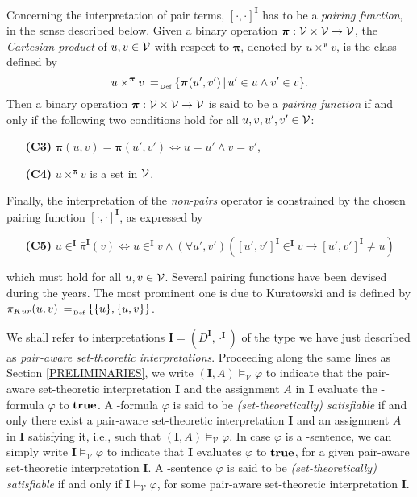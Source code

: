 \documentclass[a4paper]{llncs}
\newcommand{\nonpairssym}{\bar{\pi}}
\newcommand{\inter}{\ensuremath{\mathbf{I}}\xspace}
\newcommand{\vmodels}[2]{#1 \models_{\mathcal{V}} #2}
\newcommand{\vsat}[1]{\vmodels{*}{#1}}
\begin{document}
Concerning the interpretation of pair terms, $[\cdot,\cdot]^{\inter}$ 
has to be a \emph{pairing function},
in the sense described below.
Given a binary operation $\boldsymbol{\pi}: \mathcal{V} \times \mathcal{V} 
\rightarrow \mathcal{V}$, the \emph{Cartesian product} of $u, v \in \mathcal{V}$ 
with
respect to $\boldsymbol{\pi}$, denoted by $u 
\times^{\boldsymbol{\pi}} v$, is the class defined by
\[
u \times^{\boldsymbol{\pi}} v \defAs \{ \boldsymbol{\pi}(u',v') \,|\, 
u' \in u \wedge v' \in v \}.
\]
Then a binary operation $\boldsymbol{\pi}: \mathcal{V} \times \mathcal{V} 
\rightarrow \mathcal{V}$ is said to be a \emph{pairing function} if
and only if the following two conditions hold for all $u,v,u',v' \in
\mathcal{V}$:
\begin{enumerate}[leftmargin=.9cm]
  \item[\textbf{(C3)}]$\boldsymbol{\pi}(u,v)=\boldsymbol{\pi}(u',v') 
\iff u=u' \wedge v=v'$,
  \item[\textbf{(C4)}]$u \times^{\boldsymbol{\pi}} v$ is a set in $\mathcal{V}$.
\end{enumerate}
Finally, the interpretation of the
\emph{non-pairs} operator is constrained by the chosen
pairing function $[\cdot,\cdot]^\inter$, as expressed by
\begin{enumerate}[leftmargin=.9cm]
  \item[\textbf{(C5)}]\label{NONPAIR}
$u \in^{\inter} \nonpairssym^{\inter}(v) \iff u \in^{\inter} v \wedge 
(\forall u', v')([u', v']^{\inter} \in^{\inter} v \rightarrow [u', 
v']^{\inter}\neq u)
$
\end{enumerate}
which must hold for all $u,v \in \mathcal{V}$. Several pairing
functions have been devised during the years.
The most prominent one is due to Kuratowski and is defined by $\pi_{Kur}(u, v)
\defAs \{\{u\}, \{u,v\}\}$.

We shall refer to interpretations $\inter=(D^{\inter}, \cdot^\inter)$ 
of the type we have just described as
\emph{pair-aware set-theoretic interpretations}. Proceeding along the same lines as Section \ref{PRELIMINARIES},  we write 
$\vmodels{(\inter, A)}{\varphi}$ to indicate that the pair-aware set-theoretic interpretation $\inter$ and the assignment $A$ in $\inter$ evaluate the \Forallpizero-formula $\varphi$ to $\mathbf{true}$. A \Forallpizero-formula $\varphi$ is said to be
\emph{(set-theoretically) satisfiable}
if and only there exist a pair-aware
set-theoretic interpretation $\inter$ and an assignment $A$ in $\inter$ satisfying it,
i.e., such that $\vmodels{(\inter,A)}{\varphi}$. In case $\varphi$ is a 
\Forallpizero-sentence, we can simply write $\vmodels{\inter}{\varphi}$ to indicate that $\inter$ evaluates $\varphi$ to $\mathbf{true}$, for a given  
pair-aware set-theoretic interpretation $\inter$. A \Forallpizero-sentence $\varphi$ is said to be
\emph{(set-theoretically) satisfiable} if and only if $\vmodels{\inter}{\varphi}$, for some 
pair-aware set-theoretic interpretation $\inter$. 
\end{document}
